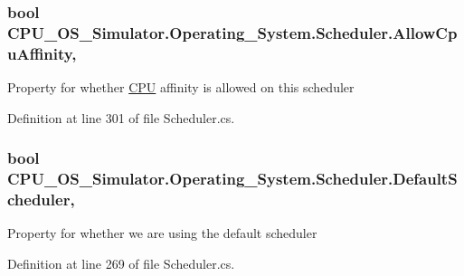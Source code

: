 \subsubsection[{Allow\+Cpu\+Affinity}]{\setlength{\rightskip}{0pt plus 5cm}bool C\+P\+U\+\_\+\+O\+S\+\_\+\+Simulator.\+Operating\+\_\+\+System.\+Scheduler.\+Allow\+Cpu\+Affinity\hspace{0.3cm}{\ttfamily [get]}, {\ttfamily [set]}}\label{class_c_p_u___o_s___simulator_1_1_operating___system_1_1_scheduler_a904a19345a3ceffa809aac3e0ad06321}


Property for whether \hyperlink{namespace_c_p_u___o_s___simulator_1_1_c_p_u}{C\+P\+U} affinity is allowed on this scheduler 



Definition at line 301 of file Scheduler.\+cs.

\hypertarget{class_c_p_u___o_s___simulator_1_1_operating___system_1_1_scheduler_acef6087d200a91657055a533ac0e3474}{}
\subsubsection[{Default\+Scheduler}]{\setlength{\rightskip}{0pt plus 5cm}bool C\+P\+U\+\_\+\+O\+S\+\_\+\+Simulator.\+Operating\+\_\+\+System.\+Scheduler.\+Default\+Scheduler\hspace{0.3cm}{\ttfamily [get]}, {\ttfamily [set]}}\label{class_c_p_u___o_s___simulator_1_1_operating___system_1_1_scheduler_acef6087d200a91657055a533ac0e3474}


Property for whether we are using the default scheduler 



Definition at line 269 of file Scheduler.\+cs.

\hypertarget{class_c_p_u___o_s___simulator_1_1_operating___system_1_1_scheduler_a7f0cc5668527496de0028013dae3be0c}{}
